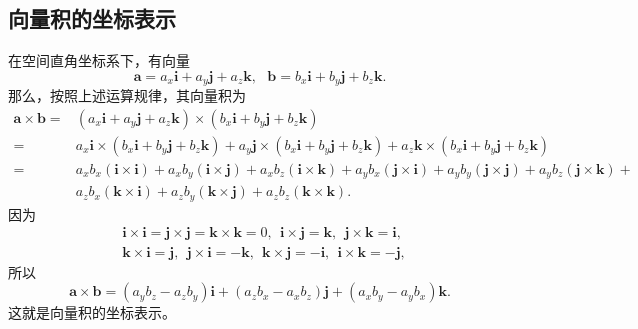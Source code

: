 \subsection{向量积的坐标表示}
在空间直角坐标系下，有向量
\begin{equation}
    \boldsymbol{a}=a_x\boldsymbol{i}+a_y\boldsymbol{j}
    +a_z\boldsymbol{k},~~~\boldsymbol{b}=b_x\boldsymbol{i}
    +b_y\boldsymbol{j}+b_z\boldsymbol{k}.
\end{equation}
那么，按照上述运算规律，其向量积为
\begin{equation}
    \begin{aligned}
        \boldsymbol{a}\times \boldsymbol{b} 
        =&(a_x\boldsymbol{i}+a_y\boldsymbol{j}+a_z\boldsymbol{k})\times(b_x\boldsymbol{i}+b_y\boldsymbol{j}+b_z\boldsymbol{k})  \\
        =&a_x\boldsymbol{i}\times(b_x\boldsymbol{i}+b_y\boldsymbol{j}+b_z\boldsymbol{k})+a_y\boldsymbol{j}\times(b_x\boldsymbol{i}+b_y\boldsymbol{j}+b_z\boldsymbol{k})+a_z\boldsymbol{k}\times(b_x\boldsymbol{i}+b_y\boldsymbol{j}+b_z\boldsymbol{k}) \\
        =&a_xb_x(\boldsymbol{i}\times\boldsymbol{i})+a_xb_y(\boldsymbol{i}\times\boldsymbol{j})+a_xb_z(\boldsymbol{i}\times\boldsymbol{k})+a_yb_x(\boldsymbol{j}\times\boldsymbol{i})+a_yb_y(\boldsymbol{j}\times\boldsymbol{j})+a_yb_z(\boldsymbol{j}\times\boldsymbol{k})+ \\
        &a_zb_x(\boldsymbol{k}\times\boldsymbol{i})+a_zb_y(\boldsymbol{k}\times\boldsymbol{j})+a_zb_z(\boldsymbol{k}\times\boldsymbol{k}).
    \end{aligned}
\end{equation}
因为 
\begin{equation}
    \begin{aligned}
        &\boldsymbol{i}\times \boldsymbol{i}=\boldsymbol{j}\times \boldsymbol{j}
        =\boldsymbol{k}\times \boldsymbol{k}=0,
        ~~\boldsymbol{i}\times \boldsymbol{j}=\boldsymbol{k},~~
        \boldsymbol{j}\times \boldsymbol{k}=\boldsymbol{i},~~\\
        &\boldsymbol{k}\times \boldsymbol{i}=\boldsymbol{j},~~
        \boldsymbol{j}\times \boldsymbol{i}=-\boldsymbol{k},~~
        \boldsymbol{k}\times \boldsymbol{j}=-\boldsymbol{i},~~
        \boldsymbol{i}\times \boldsymbol{k}=-\boldsymbol{j},
    \end{aligned}
\end{equation}
所以 
\begin{equation}
    \boldsymbol{a}\times\boldsymbol{b}=
    (a_yb_z-a_zb_y)\boldsymbol{i}+
    (a_zb_x-a_xb_z)\boldsymbol{j}+
    (a_xb_y-a_yb_x)\boldsymbol{k}.
\end{equation}
这就是向量积的坐标表示。
